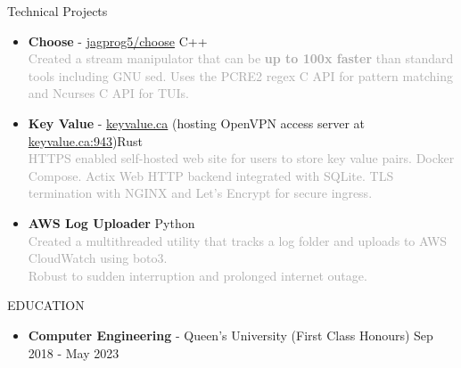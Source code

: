 \documentclass{resume} %
\begin{document}
\begin{rSection}{Technical Projects}
    \begin{itemize}
        \setlength\itemsep{-0.2em}
        \item {\bf Choose} - \href{https://github.com/jagprog5/choose/}{jagprog5/choose} \hfill C++\\
        \textcolor{darkgray}{Created a stream manipulator that can be \textbf{up to 100x faster} than standard tools including GNU sed.
        Uses the PCRE2 regex C API for pattern matching and Ncurses C API for TUIs.}
        \item {\bf Key Value} - \href{http://www.keyvalue.ca/}{keyvalue.ca} (hosting OpenVPN access server at \href{https://www.keyvalue.ca:943}{keyvalue.ca:943})\hfill Rust\\
        \textcolor{darkgray}{HTTPS enabled self-hosted web site for users to store key value pairs. Docker Compose. Actix Web HTTP backend integrated with SQLite. TLS termination with NGINX and Let's Encrypt for secure ingress.}
        \item {\bf AWS Log Uploader} \hfill Python\\
        \textcolor{darkgray}{Created a multithreaded utility that tracks a log folder and uploads to AWS CloudWatch using boto3.\\
        Robust to sudden interruption and prolonged internet outage.}
    \end{itemize}
\end{rSection}

\begin{rSection}{EDUCATION}
    \begin{itemize}
        \item {\bf Computer Engineering} - Queen's University (First Class Honours) \hfill {Sep 2018 - May 2023}
    \end{itemize}
\end{rSection}
\end{document}
